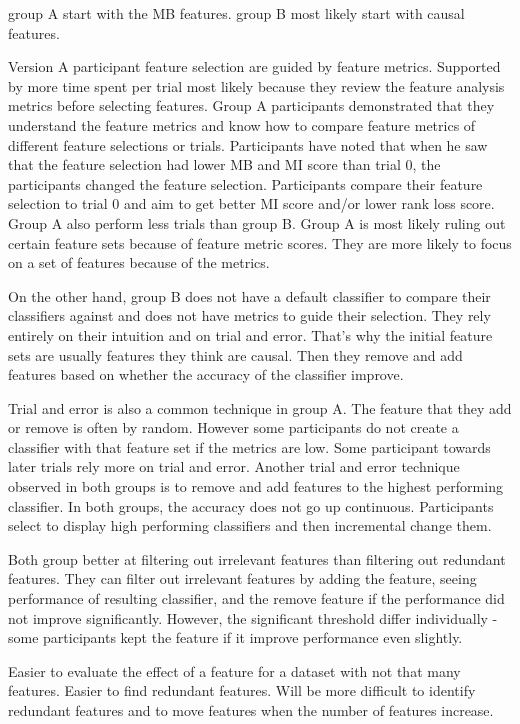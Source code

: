 group A start with the MB features. group B most likely start with causal features.

Version A participant feature selection are guided by feature metrics. Supported by more time spent per trial most likely because they review the feature analysis metrics before selecting features. Group A participants demonstrated that they understand the feature metrics and know how to compare feature metrics of different feature selections or trials. Participants have noted that when he saw that the feature selection had lower MB and MI score than trial 0, the participants changed the feature selection. Participants compare their feature selection to trial 0 and aim to get better MI score and/or lower rank loss score. Group A also perform less trials than group B. Group A is most likely ruling out certain feature sets because of feature metric scores. They are more likely to focus on a set of features because of the metrics.

On the other hand, group B does not have a default classifier to compare their classifiers against and does not have metrics to guide their selection. They rely entirely on their intuition and on trial and error. That's why the initial feature sets are usually features they think are causal. Then they remove and add features based on whether the accuracy of the classifier improve.

Trial and error is also a common technique in group A. The feature that they add or remove is often by random. However some participants do not create a classifier with that feature set if the metrics are low. Some participant towards later trials rely more on trial and error.
Another trial and error technique observed in both groups is to remove and add features to the highest performing classifier. In both groups, the accuracy does not go up continuous. Participants select to display high performing classifiers and then incremental change them.

Both group better at filtering out irrelevant features than filtering out redundant features. They can filter out irrelevant features by adding the feature, seeing performance of resulting classifier, and the remove feature if the performance did not improve significantly. However, the significant threshold differ individually - some participants kept the feature if it improve performance even slightly.

Easier to evaluate the effect of a feature for a dataset with not that many features. Easier to find redundant features. Will be more difficult to identify redundant features and to move features when the number of features increase.

